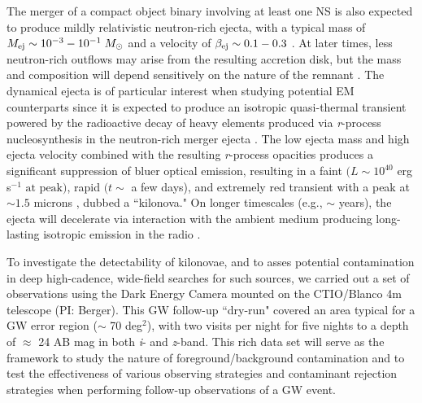 The merger of a compact object binary involving at least one NS is also expected to produce mildly relativistic neutron-rich ejecta, with a typical mass of $M_{{\rm ej}} \sim 10^{-3}-10^{-1}\; M_{\odot}$ and a velocity of $\beta_{{\rm ej}} \sim 0.1-0.3$ \citep[see e.g.,][]{Rosswog+99,Rosswog2005,Bauswein+13a}. At later times, less neutron-rich outflows may arise from the resulting accretion disk, but the mass and composition will depend sensitively on the nature of the remnant \citep[see e.g.,][]{Metzger+09a,Dessart+09,FernandezMetzger13,Fernandez+15}. The dynamical ejecta is of particular interest when studying potential EM counterparts since it is expected to produce an isotropic quasi-thermal transient powered by the radioactive decay of heavy elements produced via {\em r}-process nucleosynthesis in the neutron-rich merger ejecta \citep{LP98,Rosswog2005,Metzger+10,Grossman+14,Tanaka+14}. The low ejecta mass and high ejecta velocity combined with the resulting {\em r}-process opacities \citep[$\kappa \sim 10-100 \; \text{cm}^2 \text{ g}^{-1} \text{ for } \lambda \sim 0.3 - 3\; \mu\text{m}$,][]{Kasen+13} produces a significant suppression of bluer optical emission, resulting in a faint $(L \sim 10^{40}$ erg s$^{-1} \text{ at peak})$, rapid $(t \sim$ a few days), and extremely red transient with a peak at $\sim1.5$ microns \citep[see e.g.,][]{Kasen+13,BarnesKasen13,TanakaHotokezaka13}, dubbed a ``kilonova." On longer timescales (e.g., $\sim$ years), the ejecta will decelerate via interaction with the ambient medium producing long-lasting isotropic emission in the radio \citep{NakarPiran11}.

To investigate the detectability of kilonovae, and to asses potential contamination in deep high-cadence, wide-field searches for such sources, we carried out a set of observations using the Dark Energy Camera \citep[DECam][]{Flaugher+15} mounted on the CTIO/Blanco 4m telescope (PI: Berger). This GW follow-up ``dry-run" covered an area typical for a GW error region ($\sim$ 70 deg$^2$), with two visits per night for five nights to a depth of $\approx$ 24 AB mag in both {\em i}- and {\em z}-band. This rich data set will serve as the framework to study the nature of foreground/background contamination and to test the effectiveness of various observing strategies and contaminant rejection strategies when performing follow-up observations of a GW event.

